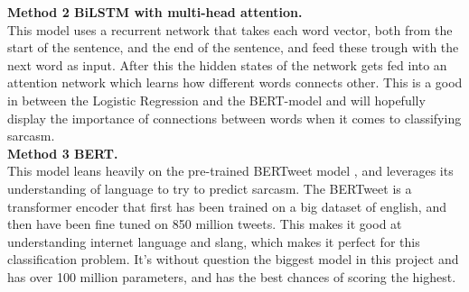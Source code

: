 \documentclass[
 reprint,
 amsmath,amssymb,
 aps,
]{revtex4-2}
\begin{document}
\noindent
{\bf Method 2 BiLSTM with multi-head attention.} \\{This model uses a recurrent network that takes each word vector, both from the start of the sentence, and the end of the sentence, and feed these trough with the next word as input. After this the hidden states of the network gets fed into an attention network which learns how different words connects other. This is a good in between the Logistic Regression and the BERT-model and will hopefully display the importance of connections between words when it comes to classifying sarcasm.}
\\

\noindent
{\bf Method 3 BERT.}\\ {This model leans heavily on the pre-trained BERTweet model \cite{bertweet}, and leverages its understanding of language to try to predict sarcasm. The BERTweet is a transformer encoder that first has been trained on a big dataset of english, and then have been fine tuned on 850 million tweets. This makes it good at understanding internet language and slang, which makes it perfect for this classification problem. It's without question the biggest model in this project and has over 100 million parameters, and has the best chances of scoring the highest.}
\end{document}
